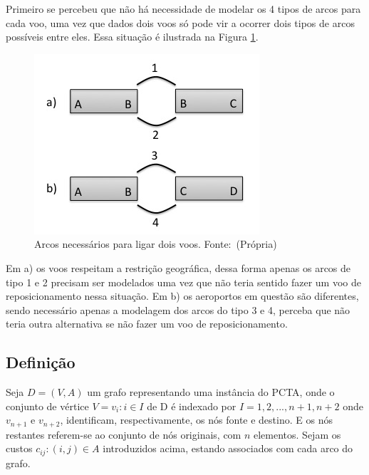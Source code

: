 Primeiro se percebeu que não há necessidade de modelar os 4 tipos de arcos para
cada voo, uma vez que dados dois voos só pode vir a ocorrer dois tipos de arcos
possíveis entre eles. Essa situação é ilustrada na Figura
\ref{fig:modelagem_arcos}.

\begin{figure}[ht]
	\centering
	\caption{Arcos necessários para ligar dois voos. \newline \mbox{Fonte:
	(Própria)}}\label{fig:modelagem_arcos}
	\includegraphics[scale=0.4]{./img/modelagem_arcos}
\end{figure}


Em a) os voos respeitam a restrição geográfica, dessa forma apenas os arcos de
tipo 1 e 2 precisam ser modelados uma vez que não teria sentido fazer um voo de
reposicionamento nessa situação. Em b) os aeroportos em questão são diferentes,
sendo necessário apenas a modelagem dos arcos do tipo 3 e 4, perceba que não
teria outra alternativa se não fazer um voo de reposicionamento.

\subsection{Definição}

Seja $D = (V,A)$ um grafo representando uma instância do PCTA, onde o conjunto
de vértice $V = {v_{i}:i \in I}$ de D é indexado por $I = {1, 2, ..., n+1,
n+2}$ onde $v_{n+1}$ e $v_{n+2}$, identificam, respectivamente, os nós fonte e
destino. E os nós restantes referem-se ao conjunto de nós originais, com $n$
elementos. Sejam os custos ${c_{ij}:(i,j) \in A}$ introduzidos acima, estando
associados com cada arco do grafo.
  
